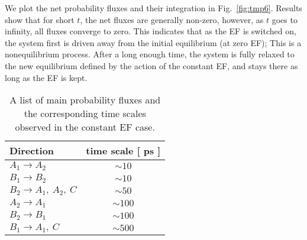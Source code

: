 \documentclass[a4paper,preprint,unsortedaddress,onecolumn]{revtex4-1}
\begin{document}
We plot the net probability fluxes and their integration in Fig.~\ref{fig:tmp6}.
Results show that for short $t$, the net fluxes are generally non-zero, however, 
as $t$ goes to infinity,
all fluxes converge to zero. This indicates
that as the EF is switched on, the system first is driven away from the initial
equilibrium (at zero EF);  This is a nonequilibrium process.
After a long enough time, the system
is fully relaxed to the new equilibrium defined by the action of the constant EF,
and stays there as long as the EF is kept.

\begin{table}
  \centering
  \begin{tabular*}{0.4\textwidth}{@{\extracolsep{\fill}}lc}\hline\hline
    Direction        & time scale [ ps ] \\\hline
    $A_1\rightarrow A_2$        &       $\sim 10$      \\
    $B_1\rightarrow B_2$        &       $\sim 10$      \\    
    $B_2\rightarrow A_1,\ A_2,\ C$        &       $\sim 50$      \\    
    $A_2\rightarrow A_1$        &       $\sim 100$      \\
    $B_2\rightarrow B_1$        &       $\sim 100$      \\    
    $B_1\rightarrow A_1,\ C$        &       $\sim 500$      \\    \hline\hline
  \end{tabular*}
  \caption{A list of main probability fluxes and the corresponding time scales observed in the constant EF case.}
  \label{tab:tmp1}
\end{table}
\end{document}
